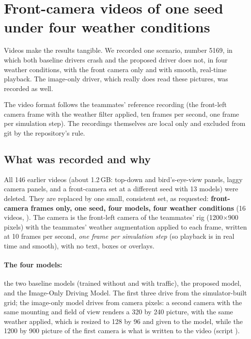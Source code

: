 \section{Front-camera videos of one seed under four weather conditions}\label{sec:videos}

\begin{plainwords}
Videos make the results tangible. We recorded one scenario, number 5169, in which both baseline drivers crash and the proposed driver does not, in four weather conditions, with the front camera only and with smooth, real-time playback. The image-only driver, which really does read these pictures, was recorded as well.
\end{plainwords}
\begin{cautionbox}
The video format follows the teammates' reference recording (the front-left camera frame with the weather filter applied, ten frames per second, one frame per simulation step). The recordings themselves are local only and excluded from git by the repository's  rule.
\end{cautionbox}


\subsection{What was recorded and why}
All 146 earlier videos (about 1.2\,GB: top-down and bird's-eye-view panels, laggy camera panels, and a front-camera set at a different seed with 13 models) were deleted. They are replaced by one small, consistent set, as requested: \textbf{front-camera frames only, one seed, four models, four weather conditions} (16 videos, ).
The camera is the front-left camera of the teammates' rig (1200$\times$900 pixels) with the teammates' weather augmentation applied to each frame, written at 10 frames per second, \emph{one frame per simulation step} (so playback is in real time and smooth), with no text, boxes or overlays.

\paragraph{The four models:} the two baseline models (trained without and with traffic), the proposed model, and the Image-Only Driving Model. The first three drive from the simulator-built grid; the image-only model drives from camera pixels: a second camera with the same mounting and field of view renders a 320 by 240 picture, with the same weather applied, which is resized to 128 by 96 and given to the model, while the 1200 by 900 picture of the first camera is what is written to the video (script ).
